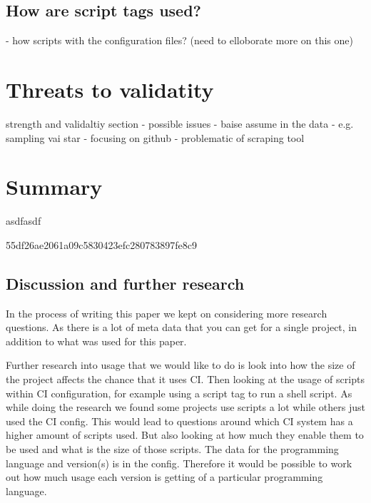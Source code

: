 \documentclass[twoside,12pt,titlepage,a4paper]{article}
\begin{document}
\vspace*{-0.05in}
\subsection{How are script tags used?}
\vspace*{-0.05in}

- how scripts with the configuration files? (need to elloborate more on this one)

\section{Threats to validatity}

strength and validaltiy section 
- possible issues
- baise assume in the data
	 - e.g. sampling vai star
- focusing on github
- problematic of scraping tool





\section{Summary}

asdfasdf

55df26ae2061a09c5830423efc280783897fe8c9
\vspace*{-0.05in}
\subsection{Discussion and further research}
\vspace*{-0.05in}
In the process of writing this paper we kept on considering more research questions. As there is a lot of meta data that you can get for a single project, in addition to what was used for this paper.

Further research into usage that we would like to do is look into how the size of the project affects the chance that it uses CI. Then looking at the usage of scripts within CI configuration, for example using a script tag to run a shell script. As while doing the research we found some projects use scripts a lot while others just used the CI config. This would lead to questions around which CI system has a higher amount of scripts used. But also looking at how much they enable them to be used and what is the size of those scripts.
The data for the programming language and version(s) is in the config. Therefore it would be possible to work out how much usage each version is getting of a particular programming language.
\end{document}
